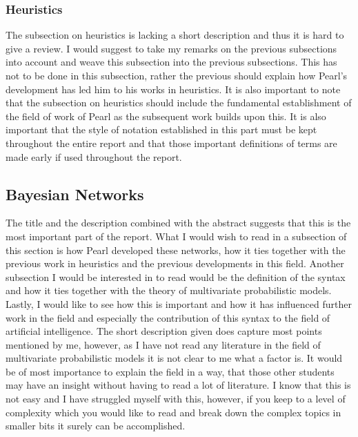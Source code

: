 \documentclass{article}
\begin{document}
\subsubsection{Heuristics}
The subsection on heuristics is lacking a short description and thus it is hard to give a review. I would suggest to take my remarks on the previous subsections into account and weave this subsection into the previous subsections. This has not to be done in this subsection, rather the previous should explain how Pearl's development has led him to his works in heuristics. It is also important to note that the subsection on heuristics should include the fundamental establishment of the field of work of Pearl as the subsequent work builds upon this. It is also important that the style of notation established in this part must be kept throughout the entire report and that those important definitions of terms are made early if used throughout the report.

\subsection{Bayesian Networks}
The title and the description combined with the abstract suggests that this is the most important part of the report. What I would wish to read in a subsection of this section is how Pearl developed these networks, how it ties together with the previous work in heuristics and the previous developments in this field. Another subsection I would be interested in to read would be the definition of the syntax and how it ties together with the theory of multivariate probabilistic models.\\
Lastly, I would like to see how this is important and how it has influenced further work in the field and especially the contribution of this syntax to the field of artificial intelligence. The short description given does capture most points mentioned by me, however, as I have not read any literature in the field of multivariate probabilistic models it is not clear to me what a factor is. It would be of most importance to explain the field in a way, that those other students may have an insight without having to read a lot of literature. I know that this is not easy and I have struggled myself with this, however, if you keep to a level of complexity which you would like to read and break down the complex topics in smaller bits it surely can be accomplished.
\end{document}
